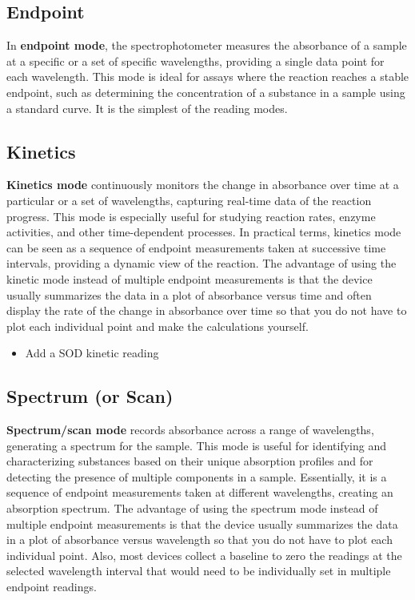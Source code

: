 \documentclass[
  9pt,
  american,
  a5paper,
  extrafontsizes,onecolumn,openright
  ]{memoir}
\providecommand{\tightlist}{%
  \setlength{\itemsep}{0pt}\setlength{\parskip}{0pt}}
\begin{document}
\subsection{Endpoint}\label{endpoint}

In \textbf{endpoint mode}, the spectrophotometer measures the absorbance of a sample at a specific or a set of specific wavelengths, providing a single data point for each wavelength. This mode is ideal for assays where the reaction reaches a stable endpoint, such as determining the concentration of a substance in a sample using a standard curve. It is the simplest of the reading modes.

\subsection{Kinetics}\label{kinetics}

\textbf{Kinetics mode} continuously monitors the change in absorbance over time at a particular or a set of wavelengths, capturing real-time data of the reaction progress. This mode is especially useful for studying reaction rates, enzyme activities, and other time-dependent processes. In practical terms, kinetics mode can be seen as a sequence of endpoint measurements taken at successive time intervals, providing a dynamic view of the reaction. The advantage of using the kinetic mode instead of multiple endpoint measurements is that the device usually summarizes the data in a plot of absorbance versus time and often display the rate of the change in absorbance over time so that you do not have to plot each individual point and make the calculations yourself.

\begin{itemize}
\tightlist
\item
  Add a SOD kinetic reading
\end{itemize}

\subsection{Spectrum (or Scan)}\label{spectrum-or-scan}

\textbf{Spectrum/scan mode} records absorbance across a range of wavelengths, generating a spectrum for the sample. This mode is useful for identifying and characterizing substances based on their unique absorption profiles and for detecting the presence of multiple components in a sample. Essentially, it is a sequence of endpoint measurements taken at different wavelengths, creating an absorption spectrum. The advantage of using the spectrum mode instead of multiple endpoint measurements is that the device usually summarizes the data in a plot of absorbance versus wavelength so that you do not have to plot each individual point. Also, most devices collect a baseline to zero the readings at the selected wavelength interval that would need to be individually set in multiple endpoint readings.
\end{document}
